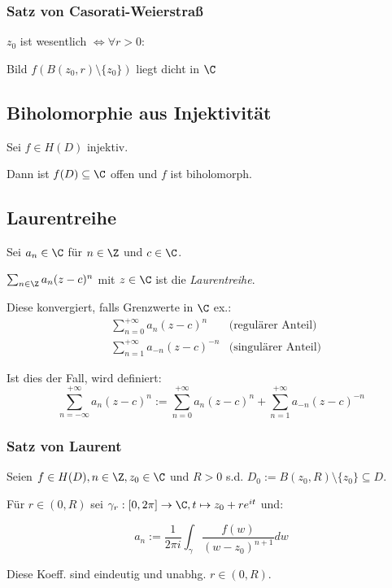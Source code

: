 \subsubsection*{Satz von Casorati-Weierstraß}

\(z_0\) ist wesentlich \(\iff \forall r > 0 :\)

Bild \(f(B(z_0,r) \setminus \{z_0\})\) liegt dicht in \(\C\)

\subsection*{Biholomorphie aus Injektivität}

Sei \(f \in H(D)\) injektiv.

Dann ist \(f(D) \subseteq \C\) offen und \(f\) ist biholomorph.

\subsection*{Laurentreihe}

Sei \(a_n \in \C\) für \(n \in \Z\) und \(c \in \C\).

\(\sum_{n \in \Z} a_n (z-c)^n\) mit \(z \in \C\) ist die \emph{Laurentreihe}.

Diese konvergiert, falls Grenzwerte in \(\C\) ex.:
\begin{align*}
&\sum_{n=0}^{+\infty} a_n(z-c)^n & \text{(regulärer Anteil)} \\
&\sum_{n=1}^{+\infty} a_{-n}(z-c)^{-n} & \text{(singulärer Anteil)}
\end{align*}

Ist dies der Fall, wird definiert:
\[ \sum_{n=-\infty}^{+\infty} a_n(z-c)^n := \sum_{n=0}^{+\infty} a_n(z-c)^n + \sum_{n=1}^{+\infty} a_{-n}(z-c)^{-n} \]

\subsubsection*{Satz von Laurent}

Seien \(f \in H(D), n \in \Z, z_0 \in \C\) und \(R > 0\) s.d. \(D_0 := B(z_0,R) \setminus \{z_0\} \subseteq D\).

Für \(r \in (0,R)\) sei \(\gamma_r : [0,2\pi] \to \C, t \mapsto z_0 + re^{it}\) und:

\[ a_n := \frac{1}{2\pi i} \int_\gamma \frac{f(w)}{(w-z_0)^{n+1}} dw \]

Diese Koeff. sind eindeutig und unabhg. \(r \in (0,R)\).

\spacing

